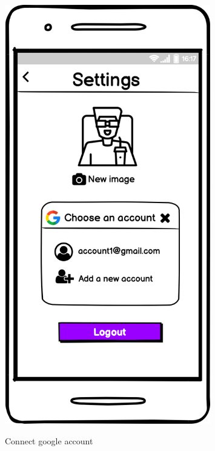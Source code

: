 \documentclass[12pt, a4paper]{article}
\numberwithin{figure}{section}
\begin{document}
\begin{center}
	\begin{minipage}{0.3\textwidth}
		\begin{figure}[H]
			\centering
			\includegraphics[width=0.8\textwidth]{images/mockups/User setting google.png}\\
			\caption{Connect google account}
		\end{figure}
	\end{minipage}
	\hspace{0.1\linewidth}
	\begin{minipage}{0.3\textwidth}
		\begin{figure}[H]
			\centering

\end{figure}
\end{minipage}
\end{center}
\end{document}
